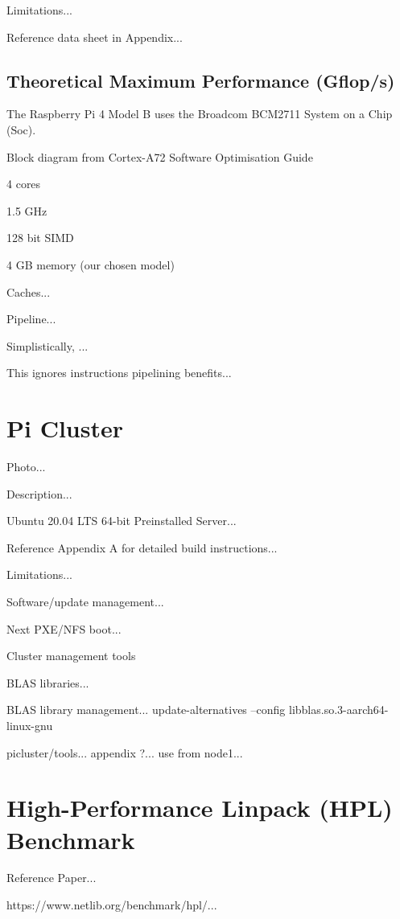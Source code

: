 \documentclass{article}
\begin{document}
Limitations...

Reference data sheet in Appendix...



\subsection{Theoretical Maximum Performance (Gflop/s)}

The Raspberry Pi 4 Model B uses the Broadcom BCM2711 System on a Chip (Soc).

Block diagram from Cortex-A72 Software Optimisation Guide

4 cores

1.5 GHz

128 bit SIMD

4 GB memory (our chosen model)

Caches...

Pipeline...

Simplistically, ...

This ignores instructions pipelining benefits...



\section{Pi Cluster}

Photo...

Description...

Ubuntu 20.04 LTS 64-bit Preinstalled Server...

Reference Appendix A for detailed build instructions...

Limitations...

Software/update management...

Next PXE/NFS boot...

Cluster management tools

BLAS libraries...

BLAS library management... update-alternatives --config libblas.so.3-aarch64-linux-gnu

picluster/tools... appendix ?... use from node1...



\section{High-Performance Linpack (HPL) Benchmark}

Reference Paper...

https://www.netlib.org/benchmark/hpl/...
\end{document}
